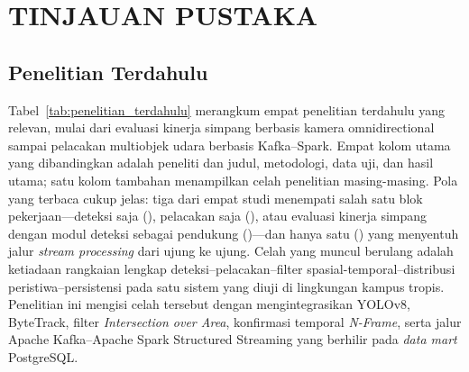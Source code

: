 
\chapter{TINJAUAN PUSTAKA}

\section{Penelitian Terdahulu}
Tabel~\ref{tab:penelitian_terdahulu} merangkum empat penelitian terdahulu yang relevan, mulai dari evaluasi kinerja simpang berbasis kamera omnidirectional sampai pelacakan multiobjek udara berbasis Kafka--Spark. Empat kolom utama yang dibandingkan adalah peneliti dan judul, metodologi, data uji, dan hasil utama; satu kolom tambahan menampilkan celah penelitian masing-masing. Pola yang terbaca cukup jelas: tiga dari empat studi menempati salah satu blok pekerjaan---deteksi saja (\cite{aboah2023helmet}), pelacakan saja (\cite{liu2025vehicle}), atau evaluasi kinerja simpang dengan modul deteksi sebagai pendukung (\cite{alunjati2025intersection})---dan hanya satu (\cite{do2025ramots}) yang menyentuh jalur \textit{stream processing} dari ujung ke ujung. Celah yang muncul berulang adalah ketiadaan rangkaian lengkap deteksi--pelacakan--filter spasial-temporal--distribusi peristiwa--persistensi pada satu sistem yang diuji di lingkungan kampus tropis. Penelitian ini mengisi celah tersebut dengan mengintegrasikan YOLOv8, ByteTrack, filter \textit{Intersection over Area}, konfirmasi temporal \textit{N-Frame}, serta jalur Apache Kafka--Apache Spark Structured Streaming yang berhilir pada \textit{data mart} PostgreSQL.

\vspace{0.5\baselineskip}


